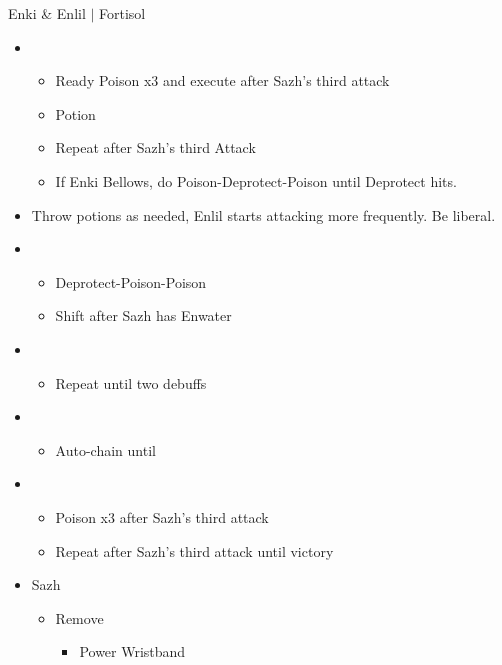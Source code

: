 \begin{battle}[1:41 $|$ 1:30]{Enki \& Enlil $|$ Fortisol}
\begin{multicols}{2}
\begin{itemize}
      \item \sixth
            \begin{itemize}
              \item Ready Poison x3 and execute after Sazh's third attack
              \item Potion
              \item Repeat after Sazh's third Attack
              \item If Enki Bellows, do Poison-Deprotect-Poison until Deprotect hits.
            \end{itemize}
      \item Throw potions as needed, Enlil starts attacking more frequently. Be liberal.
      \item \third
            \begin{itemize}
              \item Deprotect-Poison-Poison
              \item Shift after Sazh has Enwater
            \end{itemize}
      \item \fifth
            \begin{itemize}
              \item Repeat until two debuffs
            \end{itemize}
      \item \fourth
            \begin{itemize}
              \item Auto-chain until \stagger
            \end{itemize}
      \item \sixth
            \begin{itemize}
              \item Poison x3 after Sazh's third attack
              \item Repeat after Sazh's third attack until victory
            \end{itemize}
    \end{itemize}
    \vfill\null
  \end{multicols}
\end{battle}
\begin{menu}
  \begin{itemize}
    \equip
    \begin{itemize}
      \item Sazh
            \begin{itemize}
              \item Remove
                    \begin{itemize}
                      \item Power Wristband
                    \end{itemize}
            \end{itemize}
    \end{itemize}
  \end{itemize}
\end{menu}
